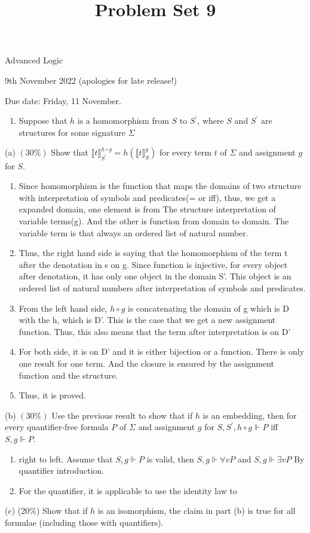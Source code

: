 \documentclass[10pt]{article}
\title{Problem Set 9 }
\author{}
\date{}
\begin{document}
\maketitle
Advanced Logic

9th November 2022 (apologies for late release!)

Due date: Friday, 11 November.

\begin{enumerate}
  \item Suppose that \(h\) is a homomorphism from \(S\) to \(S^{\prime}\), where \(S\) and \(S^{\prime}\) are structures for some signature \(\Sigma\)
\end{enumerate}

(a) \((30 \%)\) Show that $\llbracket t \rrbracket_{S^{\prime}}^{h \circ g}=h\left(\llbracket t \rrbracket_S^g\right)$ for every term \(t\) of \(\Sigma\) and assignment \(g\) for \(S\).
\begin{enumerate}
  \item Since homomorphism is the function that maps the domains of two structure with interpretation of symbols and predicates(= or iff), thus, we get a expanded domain, one element is from The structure interpretation of variable terms(g). And the other is function from domain to domain. The variable term is that always an ordered list of natural number. 
  \item Thus, the right hand side is saying that the homomorphism of the term t after the denotation in s on g. Since function is injective, for every object after denotation, it has only one object in the domain S'. This object is an ordered list of natural numbers after interpretation of symbols and predicates.
  \item From the left hand side, $h \circ g$ is concatenating the domain of g which is D with the h, which is D'. This is the case that we get a new assignment function. Thus, this also means that the term after interpretation is on D'
  \item For both side, it is on D' and it is either bijection or a function. There is only one result for one term. And the closure is ensured by the assignment function and the structure.
  \item Thus, it is proved.  

\end{enumerate}
(b) \((30 \%)\) Use the previous result to show that if \(h\) is an embedding, then for every quantifier-free formula \(P\) of \(\Sigma\) and assignment \(g\) for \(S, S^{\prime}, h \circ g \Vdash P\) iff \(S, g \Vdash P\).
\begin{enumerate}
  \item right to left. Assume that $S, g \Vdash P$ is valid, then $ S, g \Vdash \forall v P$ and $S,g \Vdash \exists vP$ By quantifier introduction. 
  \item For the quantifier, it is applicable to use the identity law to  
\end{enumerate}
(c) (20\%) Show that if \(h\) is an isomorphism, the claim in part (b) is true for all formulae (including those with quantifiers).
\end{document}
